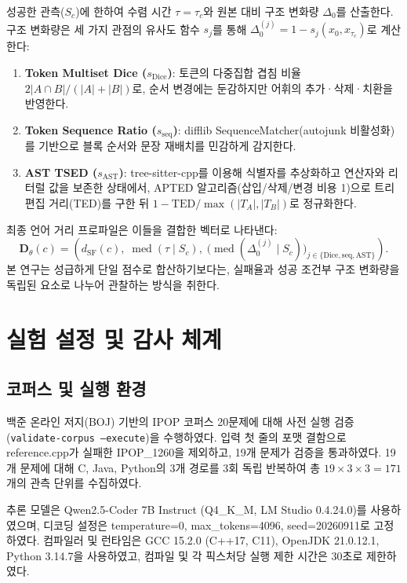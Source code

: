 \documentclass[a4paper,10pt,twocolumn,twoside]{article}
\newcommand{\dsf}{d_{\mathrm{SF}}}
\begin{document}
성공한 관측($S_c$)에 한하여 수렴 시간 $\tau = \tau_c$와 원본 대비 구조 변화량 $\Delta_0$를 산출한다. 구조 변화량은 세 가지 관점의 유사도 함수 $s_j$를 통해 $\Delta_0^{(j)} = 1 - s_j(x_0, x_{\tau_c})$로 계산한다:
\begin{enumerate}
\item \textbf{Token Multiset Dice ($s_{\mathrm{Dice}}$)}: 토큰의 다중집합 겹침 비율 $2|A \cap B| / (|A| + |B|)$로, 순서 변경에는 둔감하지만 어휘의 추가·삭제·치환을 반영한다.
\item \textbf{Token Sequence Ratio ($s_{\mathrm{seq}}$)}: difflib SequenceMatcher(autojunk 비활성화)를 기반으로 블록 순서와 문장 재배치를 민감하게 감지한다.
\item \textbf{AST TSED ($s_{\mathrm{AST}}$)}: tree-sitter-cpp를 이용해 식별자를 추상화하고 연산자와 리터럴 값을 보존한 상태에서, APTED 알고리즘(삽입/삭제/변경 비용 1)으로 트리 편집 거리(TED)를 구한 뒤 $1 - \mathrm{TED}/\max(|T_A|, |T_B|)$로 정규화한다\cite{tsed}.
\end{enumerate}
최종 언어 거리 프로파일은 이들을 결합한 벡터로 나타낸다:
\begin{equation}\label{eq:profile}
\mathbf{D}_\theta(c) = \left(\dsf(c),\; \operatorname{med}(\tau \mid S_c),\; \bigl(\operatorname{med}(\Delta_0^{(j)} \mid S_c)\bigr)_{j \in \{\mathrm{Dice}, \mathrm{seq}, \mathrm{AST}\}}\right).
\end{equation}
본 연구는 성급하게 단일 점수로 합산하기보다는, 실패율과 성공 조건부 구조 변화량을 독립된 요소로 나누어 관찰하는 방식을 취한다.

\section{실험 설정 및 감사 체계}

\subsection{코퍼스 및 실행 환경}

백준 온라인 저지(BOJ) 기반의 IPOP 코퍼스 20문제에 대해 사전 실행 검증(\texttt{validate-corpus --execute})을 수행하였다. 입력 첫 줄의 포맷 결함으로 reference.cpp가 실패한 IPOP\_1260을 제외하고, 19개 문제가 검증을 통과하였다. 19개 문제에 대해 C, Java, Python의 3개 경로를 3회 독립 반복하여 총 $19 \times 3 \times 3 = 171$개의 관측 단위를 수집하였다.

추론 모델은 Qwen2.5-Coder 7B Instruct (Q4\_K\_M, LM Studio 0.4.24.0)를 사용하였으며, 디코딩 설정은 temperature=0, max\_tokens=4096, seed=20260911로 고정하였다. 컴파일러 및 런타임은 GCC 15.2.0 (C++17, C11), OpenJDK 21.0.12.1, Python 3.14.7을 사용하였고, 컴파일 및 각 픽스처당 실행 제한 시간은 30초로 제한하였다.
\end{document}
